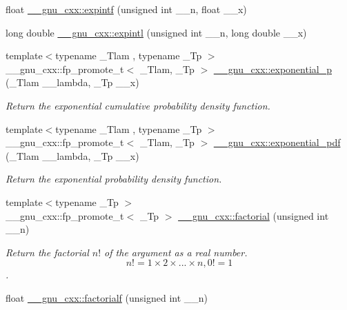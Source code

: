 \begin{DoxyCompactItemize}
\item 
float \hyperlink{group__gnu__math__spec__func_ga85751691a29807d99e990fcba61312f3}{\+\_\+\+\_\+gnu\+\_\+cxx\+::expintf} (unsigned int \+\_\+\+\_\+n, float \+\_\+\+\_\+x)
\item 
long double \hyperlink{group__gnu__math__spec__func_ga720ca0b275784c8b82193f427a2b3553}{\+\_\+\+\_\+gnu\+\_\+cxx\+::expintl} (unsigned int \+\_\+\+\_\+n, long double \+\_\+\+\_\+x)
\item 
{\footnotesize template$<$typename \+\_\+\+Tlam , typename \+\_\+\+Tp $>$ }\\\+\_\+\+\_\+gnu\+\_\+cxx\+::fp\+\_\+promote\+\_\+t$<$ \+\_\+\+Tlam, \+\_\+\+Tp $>$ \hyperlink{group__gnu__math__spec__func_gaa546f47f8ab943d2c10b56bec8a44079}{\+\_\+\+\_\+gnu\+\_\+cxx\+::exponential\+\_\+p} (\+\_\+\+Tlam \+\_\+\+\_\+lambda, \+\_\+\+Tp \+\_\+\+\_\+x)
\begin{DoxyCompactList}\small\item\em Return the exponential cumulative probability density function. \end{DoxyCompactList}\item 
{\footnotesize template$<$typename \+\_\+\+Tlam , typename \+\_\+\+Tp $>$ }\\\+\_\+\+\_\+gnu\+\_\+cxx\+::fp\+\_\+promote\+\_\+t$<$ \+\_\+\+Tlam, \+\_\+\+Tp $>$ \hyperlink{group__gnu__math__spec__func_ga7f35499a94fd8930810809988332161e}{\+\_\+\+\_\+gnu\+\_\+cxx\+::exponential\+\_\+pdf} (\+\_\+\+Tlam \+\_\+\+\_\+lambda, \+\_\+\+Tp \+\_\+\+\_\+x)
\begin{DoxyCompactList}\small\item\em Return the exponential probability density function. \end{DoxyCompactList}\item 
{\footnotesize template$<$typename \+\_\+\+Tp $>$ }\\\+\_\+\+\_\+gnu\+\_\+cxx\+::fp\+\_\+promote\+\_\+t$<$ \+\_\+\+Tp $>$ \hyperlink{group__gnu__math__spec__func_ga963b1612f50b0964f5f42c9f289aab68}{\+\_\+\+\_\+gnu\+\_\+cxx\+::factorial} (unsigned int \+\_\+\+\_\+n)
\begin{DoxyCompactList}\small\item\em Return the factorial $ n! $ of the argument as a real number. \[ n! = 1 \times 2 \times ... \times n, 0! = 1 \]. \end{DoxyCompactList}\item 
float \hyperlink{group__gnu__math__spec__func_ga5a288283a8ed63e1d2b0145f313a5378}{\+\_\+\+\_\+gnu\+\_\+cxx\+::factorialf} (unsigned int \+\_\+\+\_\+n)

\end{DoxyCompactItemize}
